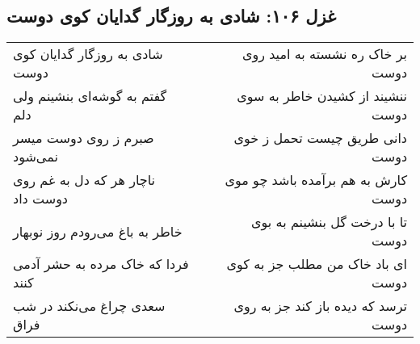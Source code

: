\begin{center}
\section*{غزل ۱۰۶: شادی به روزگار گدایان کوی دوست}
\label{sec:106}
\begin{longtable}{l p{0.5cm} r}
شادی به روزگار گدایان کوی دوست
&&
بر خاک ره نشسته به امید روی دوست
\\
گفتم به گوشه‌ای بنشینم ولی دلم
&&
ننشیند از کشیدن خاطر به سوی دوست
\\
صبرم ز روی دوست میسر نمی‌شود
&&
دانی طریق چیست تحمل ز خوی دوست
\\
ناچار هر که دل به غم روی دوست داد
&&
کارش به هم برآمده باشد چو موی دوست
\\
خاطر به باغ می‌رودم روز نوبهار
&&
تا با درخت گل بنشینم به بوی دوست
\\
فردا که خاک مرده به حشر آدمی کنند
&&
ای باد خاک من مطلب جز به کوی دوست
\\
سعدی چراغ می‌نکند در شب فراق
&&
ترسد که دیده باز کند جز به روی دوست
\\
\end{longtable}
\end{center}
